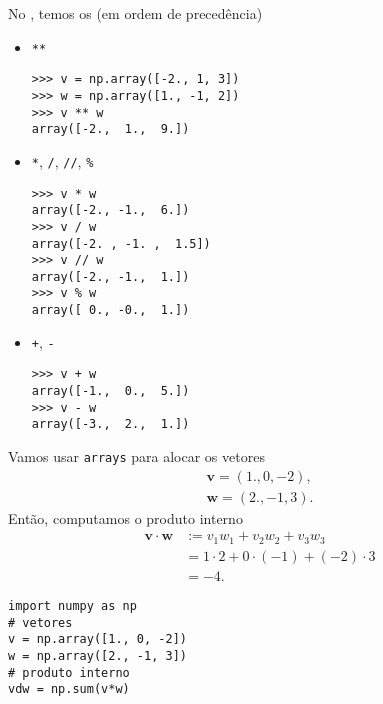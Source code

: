 No {\numpy}, temos os  (em ordem de precedência)
\begin{itemize}
\item \lstinline!**!

\begin{lstlisting}[xrightmargin=2.5em]
>>> v = np.array([-2., 1, 3])
>>> w = np.array([1., -1, 2])
>>> v ** w
array([-2.,  1.,  9.])
\end{lstlisting}

\item \lstinline!*!, \lstinline!/!, \lstinline!//!, \lstinline!%!

\begin{lstlisting}[xrightmargin=2.5em]
>>> v * w
array([-2., -1.,  6.])
>>> v / w
array([-2. , -1. ,  1.5])
>>> v // w
array([-2., -1.,  1.])
>>> v % w
array([ 0., -0.,  1.])
\end{lstlisting}

\item \lstinline!+!, \lstinline!-!

\begin{lstlisting}[xrightmargin=2.5em]
>>> v + w
array([-1.,  0.,  5.])
>>> v - w
array([-3.,  2.,  1.])
\end{lstlisting}

\end{itemize}

\begin{ex}
  Vamos usar \texttt{arrays} para alocar os vetores
  \begin{align}
    \pmb{v} = (1., 0, -2),\\
    \pmb{w} = (2., -1, 3).
  \end{align}
  Então, computamos o produto interno
  \begin{subequations}
    \begin{align}
      \pmb{v}\cdot\pmb{w} &:= v_1w_1 + v_2w_2 + v_3w_3\\
                          &= 1\cdot 2 + 0\cdot(-1) + (-2)\cdot 3\\
                          &= -4.
    \end{align}
  \end{subequations}

\begin{lstlisting}
import numpy as np
# vetores
v = np.array([1., 0, -2])
w = np.array([2., -1, 3])
# produto interno
vdw = np.sum(v*w)
\end{lstlisting}

\end{ex}

